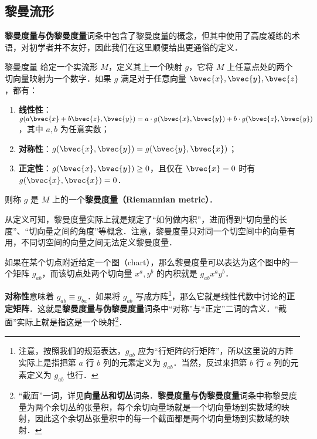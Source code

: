 



\subsection{黎曼流形}\label{RieCon_sub1}

\textbf{黎曼度量与伪黎曼度量}词条中包含了黎曼度量的概念，但其中使用了高度凝练的术语，对初学者并不友好，因此我们在这里顺便给出更通俗的定义．

\begin{definition}{黎曼度量}
给定一个实流形 $M$，定义其上一个映射 $g$，它将 $M$ 上任意点处的两个切向量映射为一个数字．如果 $g$ 满足对于任意向量 $\bvec{x}, \bvec{y}, \bvec{z}$，都有：
\begin{enumerate}
\item \textbf{线性性}：$g(a\bvec{x}+b\bvec{z}, \bvec{y})=a\cdot g(\bvec{x}, \bvec{y})+b\cdot g(\bvec{z}, \bvec{y})$，其中 $a, b$ 为任意实数；
\item \textbf{对称性}：$g(\bvec{x}, \bvec{y})=g(\bvec{y}, \bvec{x})$；
\item \textbf{正定性}：$g(\bvec{x}, \bvec{y})\geq 0$，且仅在 $\bvec{x}=0$ 时有 $g(\bvec{x}, \bvec{x})=0$．
\end{enumerate}
则称 $g$ 是 $M$ 上的一个\textbf{黎曼度量（Riemannian metric）}．
\end{definition}

从定义可知，黎曼度量实际上就是规定了“如何做内积”，进而得到“切向量的长度”、“切向量之间的角度”等概念．注意，黎曼度量只对同一个切空间中的向量有用，不同切空间的向量之间无法定义黎曼度量．

如果在某个切点附近给定一个图（chart），那么黎曼度量可以表达为这个图中的一个矩阵 $g_{ab}$，而该切点处两个切向量 ${x}^a, {y}^b$ 的内积就是 $g_{ab}{x}^a{y}^b$．

\textbf{对称性}意味着 $g_{ab}\equiv g_{ba}$．如果将 $g_{ab}$ 写成方阵\footnote{注意，按照我们的规范表达，$g_{ab}$ 应为“行矩阵的行矩阵”，所以这里说的方阵实际上是指把第 $a$ 行 $b$ 列的元素定义为 $g_{ab}$．当然，反过来把第 $b$ 行 $a$ 列的元素定义为 $g_{ab}$ 也行．}，那么它就是线性代数中讨论的\textbf{正定矩阵}．这就是\textbf{黎曼度量与伪黎曼度量}词条中“对称”与“正定”二词的含义．“截面”实际上就是指这是一个映射\footnote{“截面”一词，详见\textbf{向量丛和切丛}词条．\textbf{黎曼度量与伪黎曼度量}词条中称黎曼度量为两个余切丛的张量积，每个余切向量场就是一个切向量场到实数域的映射，因此这个余切丛张量积中的每一个截面都是两个切向量场到实数域的映射．}．


